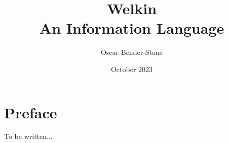 \documentclass[leqno]{book}
\title{Welkin \\
  An Information Language}
\author{Oscar Bender-Stone}
\date{October 2023}
\begin{document}
\maketitle


\chapter*{Preface}

To be written...

\mainmatter





\end{document}
